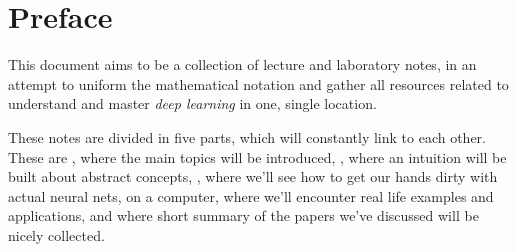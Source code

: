 \chapter*{Preface} \label{chp:preface}

This document aims to be a collection of lecture and laboratory notes, in an attempt to uniform the mathematical notation and gather all resources related to understand and master \emph{deep learning} in one, single location.

These notes are divided in five parts, which will constantly link to each other.
These are , where the main topics will be introduced, , where an intuition will be built about abstract concepts, , where we'll see how to get our hands dirty with actual neural nets, on a computer,  where we'll encounter real life examples and applications, and  where short summary of the papers we've discussed will be nicely collected.